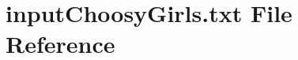 \hypertarget{inputChoosyGirls_8txt}{}\section{input\+Choosy\+Girls.\+txt File Reference}
\label{inputChoosyGirls_8txt}
